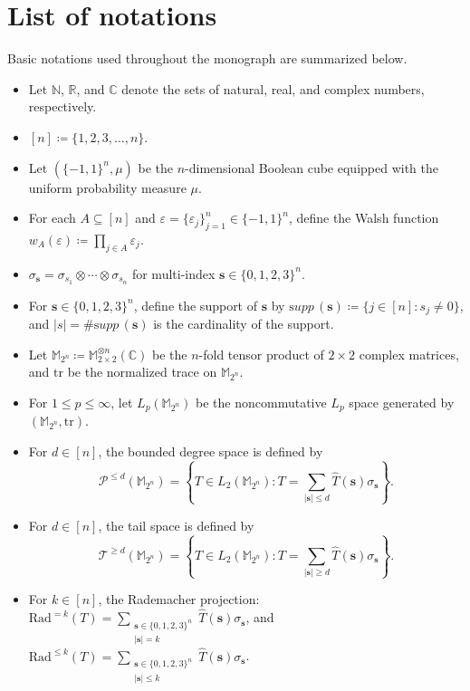 \documentclass{amsbook}
\theoremstyle{definition}
\theoremstyle{remark}
\numberwithin{section}{chapter}
\numberwithin{equation}{chapter}
\newcommand{\M}{\mathbb{M}}
\newcommand{\1}{\mathbf{1}}
\newcommand{\s}{\mathbf{s}}
\newcommand{\tr}{\mathrm{tr}}
\newcommand{\supp}{{\mathrm supp}\,}
\begin{document}
\newpage
\section{List of notations}
Basic notations used throughout the monograph are summarized below.
\begin{itemize}
\item Let $\mathbb{N}$, $\mathbb{R}$, and $\mathbb{C}$ denote the sets of natural, real, and complex numbers, respectively.
\item $[n]\coloneqq \{1,2,3,\dots,n\}$.
\item Let $(\{-1,1\}^{n},\mu)$ be the $n$-dimensional Boolean cube equipped with the uniform probability measure $\mu$.
\item For each $A\subseteq [n]$ and $\varepsilon=\{\varepsilon_{j}\}_{j=1}^{n}\in \{-1,1\}^{n}$, define the Walsh function $w_A(\varepsilon)\coloneqq\prod_{j\in A}\varepsilon_j$.
\item $\sigma_{\s}=\sigma_{s_1}\otimes\cdots\otimes\sigma_{s_n}$ for multi-index $\s\in\{0,1,2,3\}^{n}$.
\item For $\s\in\{0,1,2,3\}^n$, define the support of $\s$ by $ \supp(\s)\coloneqq \{j\in[n]:s_j\neq0\}$, and $|s|=\#\supp(\s)$ is the cardinality of the support.
\item Let $\mathbb{M}_{2^{n}}\coloneqq \mathbb{M}^{\otimes n}_{2\times 2}(\mathbb{C})$ be the $n$-fold tensor product of $2\times 2$ complex matrices, and $\tr$ be the normalized trace on $\mathbb{M}_{2^{n}}$.
\item For $1\leq p\leq \infty$, let $L_{p}(\mathbb{M}_{2^{n}})$ be the noncommutative $L_{p}$ space generated by $(\mathbb{M}_{2^{n}},\tr)$.
\item For $d\in [n]$, the bounded degree space is defined by
\[
\mathcal{P}^{\leq d}(\mathbb{M}_{2^n})=\left\{T\in L_{2}(\mathbb{M}_{2^n}):T=\sum_{|\s|\leq d}\widehat{T}(\s)\sigma_{\s}\right\}.
\]
\item For $d\in [n]$, the tail space is defined by
\[
\mathcal{T}^{\geq d}(\mathbb{M}_{2^n})=\left\{T\in L_{2}(\mathbb{M}_{2^n}):T=\sum_{|\s|\geq d}\widehat{T}(\s)\sigma_{\s}\right\}.
\]
\item For $k\in [n]$, the Rademacher projection: $\mathrm{Rad}^{=k}(T) = \sum_{\substack{\mathbf{s} \in \{0,1,2,3\}^n \\ |\mathbf{s}| =k}} \widehat{T}(\mathbf{s}) \sigma_{\mathbf{s}}$, and $\mathrm{Rad}^{\leq k}(T) = \sum_{\substack{\mathbf{s} \in \{0,1,2,3\}^n \\ |\mathbf{s}|\leq k}} \widehat{T}(\mathbf{s}) \sigma_{\mathbf{s}}$.
\end{itemize}
\end{document}
